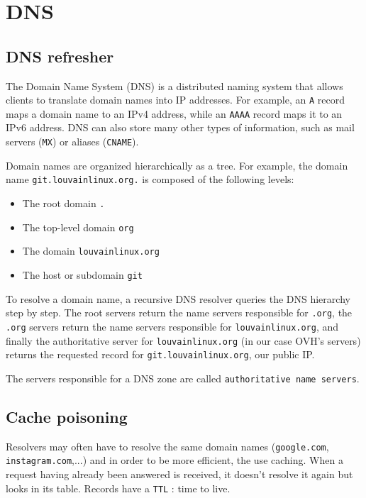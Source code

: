 \section{DNS}
\subsection{DNS refresher}

The Domain Name System (DNS) is a distributed naming system that allows clients to translate domain names into IP addresses. For example, an \texttt{A} record maps a domain name to an IPv4 address, while an \texttt{AAAA} record maps it to an IPv6 address. DNS can also store many other types of information, such as mail servers (\texttt{MX}) or aliases (\texttt{CNAME}).

Domain names are organized hierarchically as a tree. For example, the domain name \texttt{git.louvainlinux.org.} is composed of the following levels:

\begin{itemize}
    \item The root domain \texttt{.}
    \item The top-level domain \texttt{org}
    \item The domain \texttt{louvainlinux.org}
    \item The host or subdomain \texttt{git}
\end{itemize}

To resolve a domain name, a recursive DNS resolver queries the DNS hierarchy step by step. The root servers return the name servers responsible for \texttt{.org}, the \texttt{.org} servers return the name servers responsible for \texttt{louvainlinux.org}, and finally the authoritative server for \texttt{louvainlinux.org} (in our case OVH's servers) returns the requested record for \texttt{git.louvainlinux.org}, our public IP.


The servers responsible for a DNS zone are called \texttt{authoritative name servers}.


\subsection{Cache poisoning}
Resolvers may often have to resolve the same domain names (\texttt{google.com}, \texttt{instagram.com},...) and in order to be more efficient, the use caching. When a request having already been answered is received, it doesn't resolve it again but looks in its table. Records have a \texttt{TTL} : time to live.

